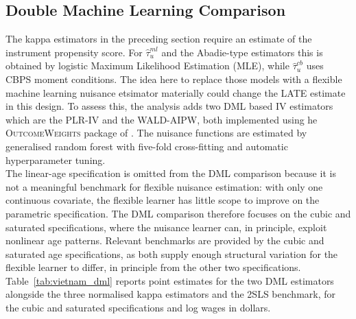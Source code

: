 \documentclass[12pt, a4paper, oneside]{article}
\theoremstyle{plain}
\theoremstyle{definition}
\begin{document}
\newpage
\subsection{Double Machine Learning Comparison}
\label{subsec:vietnam_dml}
The kappa estimators in the preceding section require an estimate of the instrument propensity score.
For $\hat\tau_u^{ml}$ and the Abadie-type estimators this is obtained by logistic Maximum Likelihood Estimation (MLE), while $\hat\tau_u^{cb}$ uses CBPS moment conditions. 
The idea here to replace those models with a flexible machine learning nuisance etsimator materially could change the LATE estimate in this design.
To assess this, the analysis adds two DML based IV estimators which are the PLR-IV and the WALD-AIPW, both implemented using he \textsc{OutcomeWeights}
package of \citet{knaus2024treatment}.
The nuisance functions are estimated by generalised random forest with five-fold cross-fitting and automatic hyperparameter tuning. \\
The linear-age specification is omitted from the DML comparison because it is not a meaningful benchmark for flexible nuisance estimation: with only one continuous covariate, the flexible learner has little scope to improve on the parametric specification. The DML comparison therefore focuses on the cubic and saturated specifications, where the nuisance learner can, in principle, exploit nonlinear age patterns. Relevant benchmarks are provided by the cubic and saturated age specifications, as both supply enough structural variation for the flexible learner to differ, in principle from the other two specifications.
Table~\ref{tab:vietnam_dml} reports point estimates for the two DML
estimators alongside the three normalised kappa estimators and the 2SLS
benchmark, for the cubic and saturated specifications and log wages in
dollars. 
\end{document}
